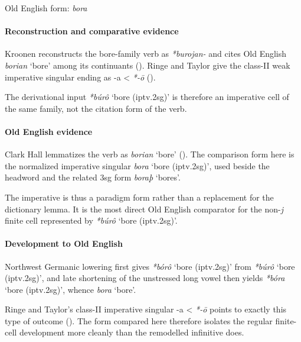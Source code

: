 \documentclass[
  british,
  a4paper,
]{article}
\providecommand{\Recon}[1]{\emph{*#1}}
\begin{document}
Old English form: \emph{bora}

\paragraph{Reconstruction and comparative
evidence}\label{reconstruction-and-comparative-evidence-127}

Kroonen reconstructs the bore-family verb as \emph{*burojan-} and cites
Old English {\emph{borian}} `bore' among its continuants
(). Ringe and Taylor give
the class-II weak imperative singular ending as -a \textless{}
\emph{*-ō} ().

The derivational input \Recon{búrô} `bore (iptv.2sg)' is therefore an
imperative cell of the same family, not the citation form of the verb.

\paragraph{Old English evidence}\label{old-english-evidence-129}

Clark Hall lemmatizes the verb as {\emph{borian}} `bore'
(). The comparison form
here is the normalized imperative singular \emph{bora} `bore
(iptv.2sg)', used beside the headword and the related 3sg form
\emph{boraþ} `bores'.

The imperative is thus a paradigm form rather than a replacement for the
dictionary lemma. It is the most direct Old English comparator for the
non-\emph{j} finite cell represented by \Recon{búrô} `bore (iptv.2sg)'.

\paragraph{Development to Old
English}\label{development-to-old-english-127}

Northwest Germanic lowering first gives \Recon{bórô} `bore (iptv.2sg)'
from \Recon{búrô} `bore (iptv.2sg)', and late shortening of the
unstressed long vowel then yields \Recon{bóra} `bore (iptv.2sg)', whence
\emph{bora} `bore'.

Ringe and Taylor's class-II imperative singular -a \textless{}
\emph{*-ō} points to exactly this type of outcome
(). The form
compared here therefore isolates the regular finite-cell development
more cleanly than the remodelled infinitive does.
\end{document}
